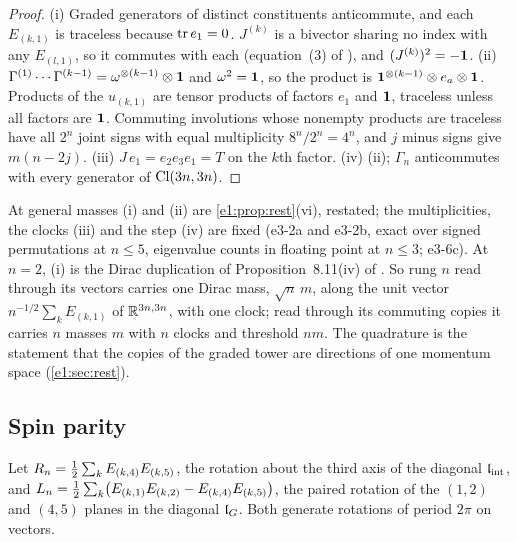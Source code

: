 \begin{proof}
(i) Graded generators of distinct constituents anticommute, and each $E_{(k,1)}$ is traceless because $\operatorname{tr} e_1=0$. $J^{(k)}$ is a bivector sharing no
index with any $E_{(l,1)}$, so it commutes with each (equation~(3) of \cite{ES17}), and $(J^{(k)})^2=-\mathbf 1$. (ii) $\Gamma^{(1)}\cdots\Gamma^{(k-1)}=\omega^{\otimes(k-1)}\otimes\mathbf 1$ and $\omega^2=\mathbf 1$, so the
product is $\mathbf 1^{\otimes(k-1)}\otimes e_a\otimes\mathbf 1$. Products of the $u_{(k,1)}$ are tensor products of factors $e_1$ and $\mathbf 1$, traceless unless all
factors are $\mathbf 1$. Commuting involutions whose nonempty products are traceless have all $2^n$ joint signs with equal multiplicity $8^n/2^n=4^n$, and $j$ minus signs give
$m(n-2j)$. (iii) $J\,e_1=e_2e_3e_1=T$ on the $k$th factor. (iv) (ii); $\Gamma_n$ anticommutes with every generator of $\mathrm{Cl}(3n,3n)$.
\end{proof}

At general masses (i) and (ii) are \cref{e1:prop:rest}(vi), restated; the multiplicities, the clocks (iii) and the step (iv) are fixed
(e3-2a and e3-2b, exact over signed permutations at $n\le5$, eigenvalue counts in floating point at $n\le3$; e3-6c). At $n=2$, (i) is the
Dirac duplication of Proposition~8.11(iv) of \cite{RE}. So rung $n$ read through its vectors carries one Dirac mass, $\sqrt n\,m$, along the unit
vector $n^{-1/2}\sum_kE_{(k,1)}$ of $\mathbb{R}^{3n,3n}$, with one clock; read through its commuting copies it carries $n$ masses $m$ with $n$ clocks and
threshold $nm$. The quadrature is the statement that the copies of the graded tower are directions of one momentum space (\cref{e1:sec:rest}).

\subsection{Spin parity}
\label{e3:sec:spin}

Let $R_n=\tfrac12\sum_kE_{(k,4)}E_{(k,5)}$, the rotation about the third axis of the diagonal $\mathfrak l_{\rm int}$, and
$L_n=\tfrac12\sum_k\bigl(E_{(k,1)}E_{(k,2)}-E_{(k,4)}E_{(k,5)}\bigr)$, the paired rotation of the $(1,2)$ and $(4,5)$ planes in the diagonal $\mathfrak l_G$. Both
generate rotations of period $2\pi$ on vectors.


